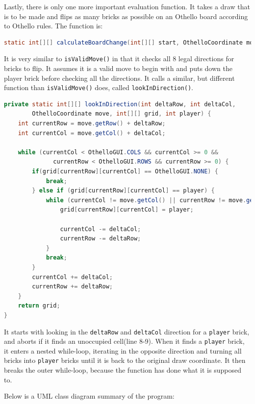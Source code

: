 \documentclass{article}
\begin{document}
Lastly, there is only one more important evaluation function. It takes a draw that is to be made and flips
as many bricks as possible on an Othello board according to Othello rules. The function is:

\begin{lstlisting}[language=Java]
static int[][] calculateBoardChange(int[][] start, OthelloCoordinate move, int player)
\end{lstlisting}

It is very similar to \verb|isValidMove()| in that it checks all 8 legal directions for bricks to flip.
It assumes it is a valid move to begin with and puts down the player brick before checking all the directions.
It calls a similar, but different function than \verb|isValidMove()| does, called \verb|lookInDirection()|.
\newpage

\begin{lstlisting}[language=Java]
private static int[][] lookInDirection(int deltaRow, int deltaCol,
        OthelloCoordinate move, int[][] grid, int player) {
    int currentRow = move.getRow() + deltaRow;
    int currentCol = move.getCol() + deltaCol;

    while (currentCol < OthelloGUI.COLS && currentCol >= 0 &&
              currentRow < OthelloGUI.ROWS && currentRow >= 0) {
        if(grid[currentRow][currentCol] == OthelloGUI.NONE) {
            break;
        } else if (grid[currentRow][currentCol] == player) {
            while (currentCol != move.getCol() || currentRow != move.getRow()) {
                grid[currentRow][currentCol] = player;

                currentCol -= deltaCol;
                currentRow -= deltaRow;
            }
            break;
        }
        currentCol += deltaCol;
        currentRow += deltaRow;
    }
    return grid;
}
\end{lstlisting}

It starts with looking in the \verb|deltaRow| and \verb|deltaCol| direction for a \verb|player| brick,
and aborts if it finds an unoccupied cell(line 8-9). When it finds a \verb|player| brick, it enters
a nested while-loop, iterating in the opposite direction and turning all bricks into \verb|player| bricks until
it is back to the original draw coordinate. It then breaks the outer while-loop, because the function has done
what it is supposed to.

Below is a UML class diagram summary of the program:
\end{document}
